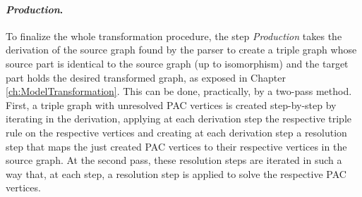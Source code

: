 \paragraph*{\emph{Production}.} To finalize the whole transformation procedure, the step \emph{Production} takes the derivation of the source graph found by the parser to create a triple graph whose source part is identical to the source graph (up to isomorphism) and the target part holds the desired transformed graph, as exposed in Chapter \ref{ch:ModelTransformation}. This can be done, practically, by a two-pass method. First, a triple graph with unresolved PAC vertices is created step-by-step by iterating in the derivation, applying at each derivation step the respective triple rule on the respective vertices and creating at each derivation step a resolution step that maps the just created PAC vertices to their respective vertices in the source graph. At the second pass, these resolution steps are iterated in such a way that, at each step, a resolution step is applied to solve the respective PAC vertices.

